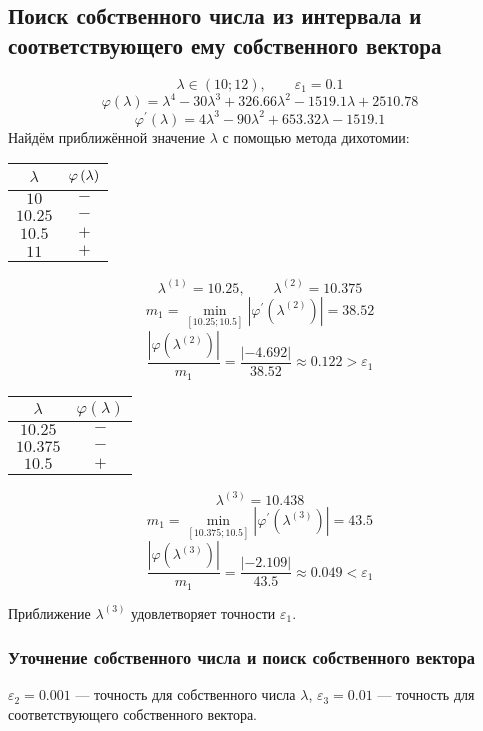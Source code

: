 \documentclass[a4paper,12pt,notitlepage,pdftex,headsepline]{scrartcl}
\begin{document}
\subsection{Поиск собственного числа из интервала и соответствующего ему собственного вектора}
\[\lambda\in\left(10;12\right),\qquad \varepsilon_1 = 0.1\]
\[
\varphi\left(\lambda\right) = \lambda^4 - 30 \lambda^3 + 326.66\lambda^2 -1519.1\lambda + 2510.78
\]
\[
\varphi^\prime\left(\lambda\right) = 4\lambda^3 - 90\lambda^2 + 653.32\lambda - 1519.1
\]
Найдём приближённой значение $\lambda$ с помощью метода дихотомии:

\begin{tabular}{c|c}
$\lambda$ & $\strut\varphi\left(\lambda\right)$\\
\hline
$10$ & $-$\\
\hline
$10.25$ & $-$\\
\hline
$10.5$ & $+$\\
\hline
$11$ & $+$
\end{tabular}

\[
\lambda^{\left(1\right)} = 10.25,\qquad \lambda^{\left(2\right)} = 10.375
\]
\[m_1 = \min\limits_{\left[10.25; 10.5\right]}\left|\varphi^\prime\left(\lambda^{\left(2\right)}\right)\right| = 38.52\]
\[\frac{\left|\varphi\left(\lambda^{\left(2\right)}\right)\right|}{m_1} = \frac{\left|-4.692\right|}{38.52} \approx 0.122 > \varepsilon_1\]

\begin{tabular}{c|c}
$\lambda$ & $\varphi\left(\lambda\right)$\\
\hline
$10.25$ & $-$\\
\hline
$10.375$ & $-$\\
\hline
$10.5$ & $+$\\
\end{tabular}

\[\lambda^{\left(3\right)} = 10.438\]
\[m_1 = \min\limits_{\left[10.375; 10.5\right]}\left|\varphi^\prime\left(\lambda^{\left(3\right)}\right)\right| = 43.5\]
\[\frac{\left|\varphi\left(\lambda^{\left(3\right)}\right)\right|}{m_1} = \frac{\left|-2.109\right|}{43.5}\approx 0.049 < \varepsilon_1\]

Приближение $\lambda^{\left(3\right)}$ удовлетворяет точности $\varepsilon_1$.

\subsubsection{Уточнение собственного числа и поиск собственного вектора}
$\varepsilon_2 = 0.001$ --- точность для собственного числа $\lambda$,
$\varepsilon_3 = 0.01$ --- точность для соответствующего собственного вектора.
\end{document}
